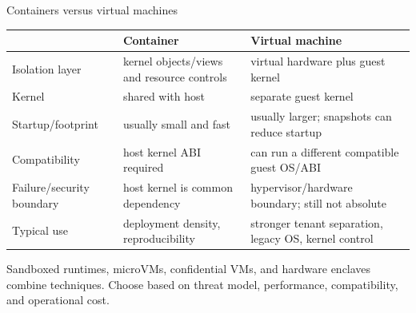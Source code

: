 \documentclass[aspectratio=169,11pt]{beamer}
\begin{document}
\begin{frame}{Containers versus virtual machines}
  \small
  \begin{tabularx}{\textwidth}{@{}lXX@{}}
    \toprule
    & \textbf{Container} & \textbf{Virtual machine} \\
    \midrule
    Isolation layer & kernel objects/views and resource controls & virtual hardware plus guest kernel \\
    Kernel & shared with host & separate guest kernel \\
    Startup/footprint & usually small and fast & usually larger; snapshots can reduce startup \\
    Compatibility & host kernel ABI required & can run a different compatible guest OS/ABI \\
    Failure/security boundary & host kernel is common dependency & hypervisor/hardware boundary; still not absolute \\
    Typical use & deployment density, reproducibility & stronger tenant separation, legacy OS, kernel control \\
    \bottomrule
  \end{tabularx}
  \begin{tcolorbox}[title=Modern continuum]
    Sandboxed runtimes, microVMs, confidential VMs, and hardware enclaves combine techniques. Choose based on threat model, performance, compatibility, and operational cost.
  \end{tcolorbox}
\end{frame}
\end{document}
